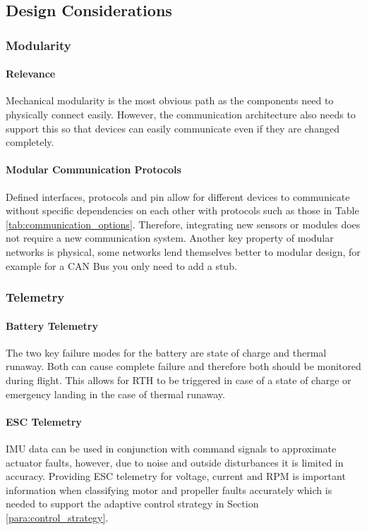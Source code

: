\subsection{Design Considerations}\label{sub_sub_section:tgt_intra_comms_design_considerations}

\subsubsection{Modularity}\label{sub_sub_section:tgt_modularity}
\paragraph{Relevance}
Mechanical modularity is the most obvious path as the components need to physically connect easily. However, the communication architecture also needs to support this so that devices can easily communicate even if they are changed completely.
\paragraph{Modular Communication Protocols}
Defined interfaces, protocols and pin allow for different devices to communicate without specific dependencies on each other with protocols such as those in Table \ref{tab:communication_options}. Therefore, integrating new sensors or modules does not require a new communication system. Another key property of modular networks is physical, some networks lend themselves better to modular design, for example for a \gls{CAN} Bus you only need to add a stub.

\subsubsection{Telemetry}\label{sub_sub_section:tgt_telemetry}
\paragraph{Battery Telemetry}
The two key failure modes for the battery are state of charge and thermal runaway. Both can cause complete failure and therefore both should be monitored during flight. This allows for \gls{RTH} to be triggered in case of a state of charge or emergency landing in the case of thermal runaway.
\paragraph{\gls{ESC} Telemetry}
\gls{IMU} data can be used in conjunction with command signals to approximate actuator faults, however, due to noise and outside disturbances it is limited in accuracy. Providing \gls{ESC} telemetry for voltage, current and \gls{RPM} is important information when classifying motor and propeller faults accurately which is needed to support the adaptive control strategy in Section \ref{para:control_strategy}.   

